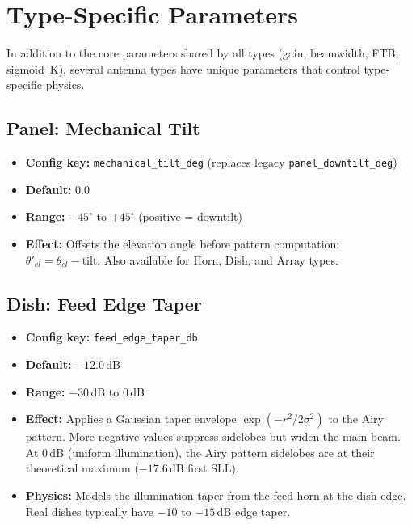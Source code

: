 \documentclass[11pt,a4paper]{article}
\begin{document}
\newpage
\section{Type-Specific Parameters}

In addition to the core parameters shared by all types (gain, beamwidth, FTB, sigmoid~K), several antenna types have unique parameters that control type-specific physics.

\subsection{Panel: Mechanical Tilt}
\begin{itemize}
    \item \textbf{Config key:} \texttt{mechanical\_tilt\_deg} (replaces legacy \texttt{panel\_downtilt\_deg})
    \item \textbf{Default:} 0.0
    \item \textbf{Range:} $-45^\circ$ to $+45^\circ$ (positive = downtilt)
    \item \textbf{Effect:} Offsets the elevation angle before pattern computation: $\theta'_{el} = \theta_{el} - \text{tilt}$. Also available for Horn, Dish, and Array types.
\end{itemize}

\subsection{Dish: Feed Edge Taper}
\begin{itemize}
    \item \textbf{Config key:} \texttt{feed\_edge\_taper\_db}
    \item \textbf{Default:} $-12.0$\,dB
    \item \textbf{Range:} $-30$\,dB to $0$\,dB
    \item \textbf{Effect:} Applies a Gaussian taper envelope $\exp(-r^2 / 2\sigma^2)$ to the Airy pattern. More negative values suppress sidelobes but widen the main beam. At $0$\,dB (uniform illumination), the Airy pattern sidelobes are at their theoretical maximum ($-17.6$\,dB first SLL).
    \item \textbf{Physics:} Models the illumination taper from the feed horn at the dish edge. Real dishes typically have $-10$ to $-15$\,dB edge taper.
\end{itemize}
\end{document}
